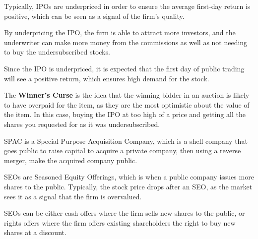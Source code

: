 Typically, IPOs are underpriced in order to ensure the average first-day return
is positive, which can be seen as a signal of the firm's quality.

By underpricing the IPO, the firm is able to attract more investors, and
the underwriter can make more money from the commissions as well as not needing to buy
the undersubscribed stocks.

Since the IPO is underpriced, it is expected that the first day of public trading will
see a positive return, which ensures high demand for the stock.

\begin{callout}
    The \textbf{Winner's Curse} is the idea that the winning bidder in an auction is 
    likely to have overpaid for the item, as they are the most optimistic 
    about the value of the item. In this case, buying the IPO at too high of a price and getting all
    the shares you requested for as it was undersubscribed.
\end{callout}

SPAC is a Special Purpose Acquisition Company, which is a shell company that 
goes public to raise capital to acquire a private company, then using a reverse merger, 
make the acquired company public.

SEOs are Seasoned Equity Offerings, which is when a public company issues more shares
to the public. Typically, the stock price drops after an SEO, as the market 
sees it as a signal that the firm is overvalued.

SEOs can be either cash offers where the firm sells new shares to the public, or rights offers
where the firm offers existing shareholders the right to buy new shares at a discount.


